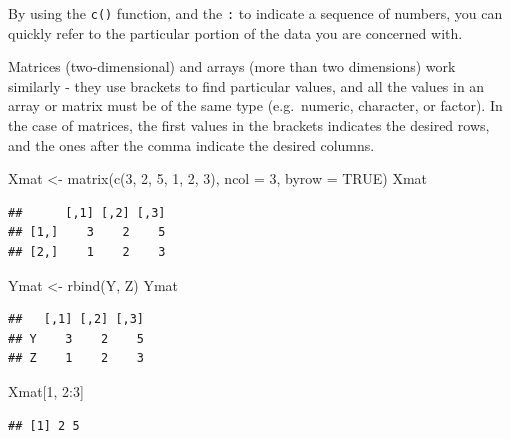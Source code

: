\documentclass[
]{book}
\newenvironment{Shaded}{\begin{snugshade}}{\end{snugshade}}
\newcommand{\AttributeTok}[1]{\textcolor[rgb]{0.77,0.63,0.00}{#1}}
\newcommand{\ConstantTok}[1]{\textcolor[rgb]{0.00,0.00,0.00}{#1}}
\newcommand{\DecValTok}[1]{\textcolor[rgb]{0.00,0.00,0.81}{#1}}
\newcommand{\FunctionTok}[1]{\textcolor[rgb]{0.00,0.00,0.00}{#1}}
\newcommand{\NormalTok}[1]{#1}
\newcommand{\OtherTok}[1]{\textcolor[rgb]{0.56,0.35,0.01}{#1}}
\newcommand{\SpecialCharTok}[1]{\textcolor[rgb]{0.00,0.00,0.00}{#1}}
\begin{document}
By using the \texttt{c()} function, and the \texttt{:} to indicate a sequence of numbers, you can quickly refer to the particular portion of the data you are concerned with.

Matrices (two-dimensional) and arrays (more than two dimensions) work similarly - they use brackets to find particular values, and all the values in an array or matrix must be of the same type (e.g.~numeric, character, or factor). In the case of matrices, the first values in the brackets indicates the desired rows, and the ones after the comma indicate the desired columns.

\begin{Shaded}
\begin{Highlighting}[]
\NormalTok{Xmat }\OtherTok{\textless{}{-}} \FunctionTok{matrix}\NormalTok{(}\FunctionTok{c}\NormalTok{(}\DecValTok{3}\NormalTok{, }\DecValTok{2}\NormalTok{, }\DecValTok{5}\NormalTok{, }\DecValTok{1}\NormalTok{, }\DecValTok{2}\NormalTok{, }\DecValTok{3}\NormalTok{), }
               \AttributeTok{ncol =} \DecValTok{3}\NormalTok{, }\AttributeTok{byrow =} \ConstantTok{TRUE}\NormalTok{)}
\NormalTok{Xmat}
\end{Highlighting}
\end{Shaded}

\begin{verbatim}
##      [,1] [,2] [,3]
## [1,]    3    2    5
## [2,]    1    2    3
\end{verbatim}

\begin{Shaded}
\begin{Highlighting}[]
\NormalTok{Ymat }\OtherTok{\textless{}{-}} \FunctionTok{rbind}\NormalTok{(Y, Z)}
\NormalTok{Ymat}
\end{Highlighting}
\end{Shaded}

\begin{verbatim}
##   [,1] [,2] [,3]
## Y    3    2    5
## Z    1    2    3
\end{verbatim}

\begin{Shaded}
\begin{Highlighting}[]
\NormalTok{Xmat[}\DecValTok{1}\NormalTok{, }\DecValTok{2}\SpecialCharTok{:}\DecValTok{3}\NormalTok{]}
\end{Highlighting}
\end{Shaded}

\begin{verbatim}
## [1] 2 5
\end{verbatim}
\end{document}

